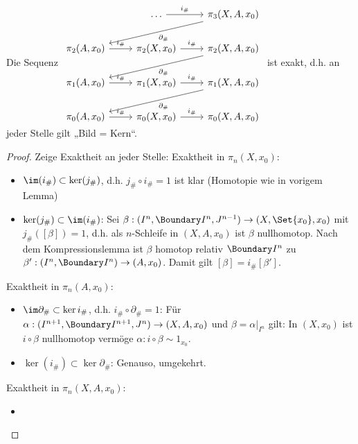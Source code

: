 \begin{st}
    Die Sequenz
    \begin{math}
        \begin{tikzcd}
            & \dotsc \ar[r,"i_\#"] & \pi_3(X, A, x_0) \ar[dll,"\partial_\#"] \\
            \pi_2(A,x_0) \ar[r,"i_\#"] & \pi_2(X, x_0) \ar[r,"i_\#"] & \pi_2(X, A, x_0) \ar[dll,"\partial_\#"] \\
            \pi_1(A,x_0) \ar[r,"i_\#"] & \pi_1(X, x_0) \ar[r,"i_\#"] & \pi_1(X, A, x_0) \ar[dll,"\partial_\#"] \\
            \pi_0(A,x_0) \ar[r,"i_\#"] & \pi_0(X, x_0) \ar[r,"i_\#"] & \pi_0(X, A, x_0)
        \end{tikzcd}
    \end{math}
    ist exakt, d.h. an jeder Stelle gilt „Bild = Kern“.
    \begin{proof}
        Zeige Exaktheit an jeder Stelle:
        Exaktheit in $\pi_n(X,x_0)$:
        \begin{itemize}
            \item
                $\im(i_\#) \subset \ker(j_\#)$, d.h. $j_\# \circ i_\# = 1$ ist klar (Homotopie wie in vorigem Lemma)
            \item
                $\ker(j_\#) \subset \im(i_\#)$:
                Sei $\beta: (I^n, \Boundary I^n, J^{n-1}) \to (X, \Set{x_0}, x_0)$ mit $j_\#([\beta]) = 1$, d.h. als $n$-Schleife in $(X, A, x_0)$ ist $\beta$ nullhomotop.
                Nach dem Kompressionslemma ist $\beta$ homotop relativ $\Boundary I^n$ zu $\beta': (I^n, \Boundary I^n) \to (A, x_0)$.
                Damit gilt $[\beta] = i_\# [\beta']$.
        \end{itemize}
        Exaktheit in $\pi_n(A, x_0)$:
        \begin{itemize}
            \item
                $\im \partial_\# \subset \ker i_\#$, d.h. $i_\# \circ \partial_\# = 1$:
                Für $\alpha: (I^{n+1}, \Boundary I^{n+1}, J^n) \to (X, A, x_0)$ und $\beta = \alpha|_{I^n}$ gilt:
                In $(X, x_0)$ ist $i \circ \beta$ nullhomotop vermöge $\alpha: i \circ \beta \sim 1_{x_0}$.
            \item
                $\ker(i_\#) \subset \ker \partial_\#$:
                Genauso, umgekehrt.
        \end{itemize}
        Exaktheit in $\pi_n(X, A, x_0)$:
        \begin{itemize}
            \item

\end{itemize}
\end{proof}
\end{st}
